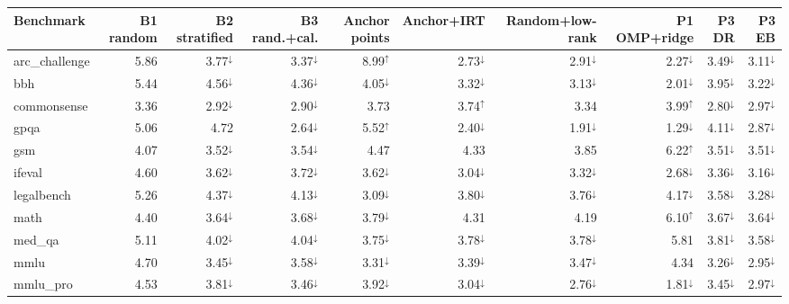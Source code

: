 {\scriptsize\setlength{\tabcolsep}{2.5pt}
\begin{tabular}{lrrrrrrrrr}
\toprule
Benchmark & B1 random & B2 stratified & B3 rand.+cal. & Anchor points & Anchor+IRT & Random+low-rank & P1 OMP+ridge & P3 DR & P3 EB \\
\midrule
arc\_challenge & 5.86 & 3.77$^{\downarrow}$ & 3.37$^{\downarrow}$ & 8.99$^{\uparrow}$ & 2.73$^{\downarrow}$ & 2.91$^{\downarrow}$ & 2.27$^{\downarrow}$ & 3.49$^{\downarrow}$ & 3.11$^{\downarrow}$ \\
bbh & 5.44 & 4.56$^{\downarrow}$ & 4.36$^{\downarrow}$ & 4.05$^{\downarrow}$ & 3.32$^{\downarrow}$ & 3.13$^{\downarrow}$ & 2.01$^{\downarrow}$ & 3.95$^{\downarrow}$ & 3.22$^{\downarrow}$ \\
commonsense & 3.36 & 2.92$^{\downarrow}$ & 2.90$^{\downarrow}$ & 3.73 & 3.74$^{\uparrow}$ & 3.34 & 3.99$^{\uparrow}$ & 2.80$^{\downarrow}$ & 2.97$^{\downarrow}$ \\
gpqa & 5.06 & 4.72 & 2.64$^{\downarrow}$ & 5.52$^{\uparrow}$ & 2.40$^{\downarrow}$ & 1.91$^{\downarrow}$ & 1.29$^{\downarrow}$ & 4.11$^{\downarrow}$ & 2.87$^{\downarrow}$ \\
gsm & 4.07 & 3.52$^{\downarrow}$ & 3.54$^{\downarrow}$ & 4.47 & 4.33 & 3.85 & 6.22$^{\uparrow}$ & 3.51$^{\downarrow}$ & 3.51$^{\downarrow}$ \\
ifeval & 4.60 & 3.62$^{\downarrow}$ & 3.72$^{\downarrow}$ & 3.62$^{\downarrow}$ & 3.04$^{\downarrow}$ & 3.32$^{\downarrow}$ & 2.68$^{\downarrow}$ & 3.36$^{\downarrow}$ & 3.16$^{\downarrow}$ \\
legalbench & 5.26 & 4.37$^{\downarrow}$ & 4.13$^{\downarrow}$ & 3.09$^{\downarrow}$ & 3.80$^{\downarrow}$ & 3.76$^{\downarrow}$ & 4.17$^{\downarrow}$ & 3.58$^{\downarrow}$ & 3.28$^{\downarrow}$ \\
math & 4.40 & 3.64$^{\downarrow}$ & 3.68$^{\downarrow}$ & 3.79$^{\downarrow}$ & 4.31 & 4.19 & 6.10$^{\uparrow}$ & 3.67$^{\downarrow}$ & 3.64$^{\downarrow}$ \\
med\_qa & 5.11 & 4.02$^{\downarrow}$ & 4.04$^{\downarrow}$ & 3.75$^{\downarrow}$ & 3.78$^{\downarrow}$ & 3.78$^{\downarrow}$ & 5.81 & 3.81$^{\downarrow}$ & 3.58$^{\downarrow}$ \\
mmlu & 4.70 & 3.45$^{\downarrow}$ & 3.58$^{\downarrow}$ & 3.31$^{\downarrow}$ & 3.39$^{\downarrow}$ & 3.47$^{\downarrow}$ & 4.34 & 3.26$^{\downarrow}$ & 2.95$^{\downarrow}$ \\
mmlu\_pro & 4.53 & 3.81$^{\downarrow}$ & 3.46$^{\downarrow}$ & 3.92$^{\downarrow}$ & 3.04$^{\downarrow}$ & 2.76$^{\downarrow}$ & 1.81$^{\downarrow}$ & 3.45$^{\downarrow}$ & 2.97$^{\downarrow}$ \\

\end{tabular}}
